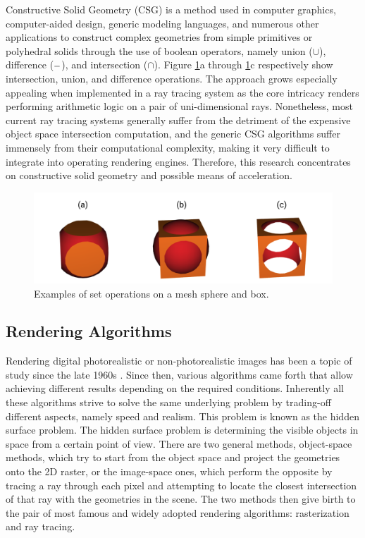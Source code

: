 \documentclass[a4paper,11pt,oneside]{article}
\newcommand{\minus}{\scalebox{0.9}[1.0]{$-$}} %
\begin{document}
Constructive Solid Geometry (CSG) is a method used in computer graphics, computer-aided design, generic modeling languages, and numerous other applications to construct complex geometries from simple primitives or polyhedral solids through the use of boolean operators, namely union ($\cup$),  difference ($\minus$), and intersection ($\cap$). Figure \ref{fig1:set_operations_examples}a through \ref{fig1:set_operations_examples}c respectively show intersection, union, and difference operations. The approach grows especially appealing when implemented in a ray tracing system as the core intricacy renders performing arithmetic logic on a pair of uni-dimensional rays. Nonetheless, most current ray tracing systems generally suffer from the detriment of the expensive object space intersection computation, and the generic CSG algorithms suffer immensely from their computational complexity, making it very difficult to integrate into operating rendering engines. Therefore, this research concentrates on constructive solid geometry and possible means of acceleration.
  
\begin{figure}[ht]
	\begin{center}
		\includegraphics[width=.6\textwidth]{intro-figures/figure1.png}
	\end{center}
	\caption{Examples of set operations on a mesh sphere and box.}
	\label{fig1:set_operations_examples}
\end{figure}
  
\subsection{Rendering Algorithms}
  
Rendering digital photorealistic or non-photorealistic images has been a topic of study since the late 1960s \cite{INITIAL_RENDERING}. Since then, various algorithms came forth that allow achieving different results depending on the required conditions. Inherently all these algorithms strive to solve the same underlying problem by trading-off different aspects, namely speed and realism. This problem is known as the hidden surface problem. The hidden surface problem is determining the visible objects in space from a certain point of view. There are two general methods, object-space methods, which try to start from the object space and project the geometries onto the 2D raster, or the image-space ones, which perform the opposite by tracing a ray through each pixel and attempting to locate the closest intersection of that ray with the geometries in the scene. The two methods then give birth to the pair of most famous and widely adopted rendering algorithms: rasterization and ray tracing.
  
\end{document}
